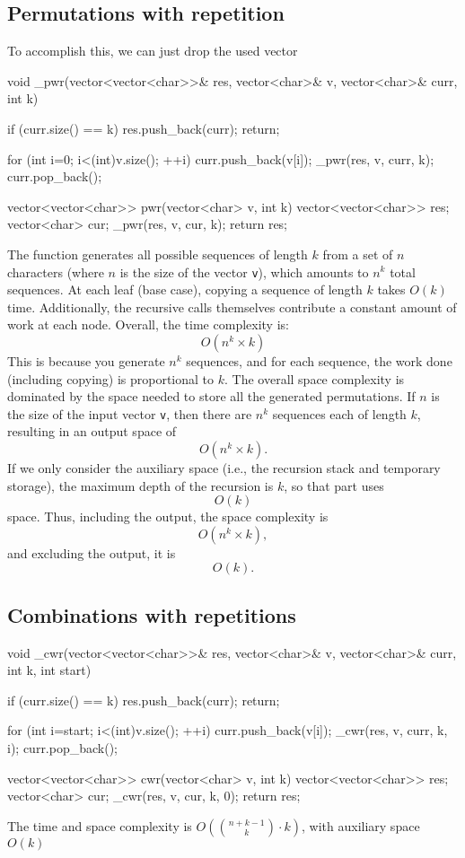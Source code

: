 \documentclass{report}
\begin{document}
\pagebreak 
\bigbreak \noindent 
\subsection{Permutations with repetition}
\bigbreak \noindent 
To accomplish this, we can just drop the used vector
\bigbreak \noindent 
\begin{cppcode}
void _pwr(vector<vector<char>>& res, vector<char>& v, vector<char>& curr, int k) {
    if (curr.size() == k) {
        res.push_back(curr);
        return;
    }

    for (int i=0; i<(int)v.size(); ++i) {
        curr.push_back(v[i]);
        _pwr(res, v, curr, k);
        curr.pop_back();
    }
}

vector<vector<char>> pwr(vector<char> v, int k) {
    vector<vector<char>> res;
    vector<char> cur;
    _pwr(res, v, cur, k);
    return res;
}
\end{cppcode}
\bigbreak \noindent 
The function generates all possible sequences of length \( k \) from a set of \( n \) characters (where \( n \) is the size of the vector \texttt{v}), which amounts to \( n^k \) total sequences. At each leaf (base case), copying a sequence of length \( k \) takes \( O(k) \) time. Additionally, the recursive calls themselves contribute a constant amount of work at each node.
\bigbreak \noindent 
Overall, the time complexity is:
\[
O(n^k \times k)
\]
This is because you generate \( n^k \) sequences, and for each sequence, the work done (including copying) is proportional to \( k \).
\bigbreak \noindent 
The overall space complexity is dominated by the space needed to store all the generated permutations. If \( n \) is the size of the input vector \texttt{v}, then there are \( n^k \) sequences each of length \( k \), resulting in an output space of 
\[
O(n^k \times k).
\]
If we only consider the auxiliary space (i.e., the recursion stack and temporary storage), the maximum depth of the recursion is \( k \), so that part uses 
\[
O(k)
\]
space.
\bigbreak \noindent 
Thus, including the output, the space complexity is 
\[
O(n^k \times k),
\]
and excluding the output, it is 
\[
O(k).
\]

\pagebreak 
\subsection{Combinations with repetitions}
\bigbreak \noindent 
\begin{cppcode}
    void _cwr(vector<vector<char>>& res, vector<char>& v, vector<char>& curr, int k, int start) {
        if (curr.size() == k) {
            res.push_back(curr);
            return;
        }

        for (int i=start; i<(int)v.size(); ++i) {
            curr.push_back(v[i]);
            _cwr(res, v, curr, k, i);
            curr.pop_back();
        }
    }

    vector<vector<char>> cwr(vector<char> v, int k) {
        vector<vector<char>> res;
        vector<char> cur;
        _cwr(res, v, cur, k, 0);
        return res;
    }
\end{cppcode}
\bigbreak \noindent 
The time and space complexity is $O\left(\binom{n+k-1}{k} \cdot k \right)$, with auxiliary space $O(k)$
\end{document}

